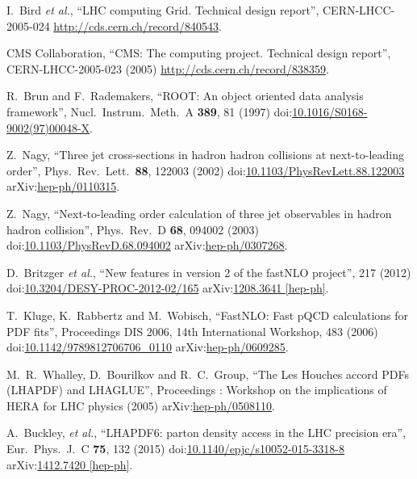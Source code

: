 \begin{thebibliography}{99}
I.~Bird {\it et al.}, ``LHC computing Grid. Technical design report'', CERN-LHCC-2005-024 \url{http://cds.cern.ch/record/840543}.

CMS Collaboration, ``CMS: The computing project. Technical design report'', CERN-LHCC-2005-023 (2005) \url{http://cds.cern.ch/record/838359}.

R.~Brun and F.~Rademakers, ``ROOT: An object oriented data analysis framework'', Nucl.\ Instrum.\ Meth.\ A {\bf 389}, 81 (1997) doi:\href{http://dx.doi.org/10.1016/S0168-9002(97)00048-X}{10.1016/S0168-9002(97)00048-X}.

Z.~Nagy, ``Three jet cross-sections in hadron hadron collisions at next-to-leading order'', Phys.\ Rev.\ Lett.\ {\bf 88}, 122003 (2002) doi:\href{http://dx.doi.org/10.1103/PhysRevLett.88.122003}{10.1103/PhysRevLett.88.122003} arXiv:\href{https://arxiv.org/abs/hep-ph/0110315}{hep-ph/0110315}.

Z.~Nagy, ``Next-to-leading order calculation of three jet observables in hadron hadron collision'', Phys.\ Rev.\ D {\bf 68}, 094002 (2003) doi:\href{http://dx.doi.org/10.1103/PhysRevD.68.094002}{10.1103/PhysRevD.68.094002} arXiv:\href{https://arxiv.org/abs/hep-ph/0307268}{hep-ph/0307268}.

D.~Britzger {\it et al.}, ``New features in version 2 of the fastNLO project'', 217 (2012) doi:\href{http://dx.doi.org/10.3204/DESY-PROC-2012-02/165}{10.3204/DESY-PROC-2012-02/165} arXiv:\href{https://arxiv.org/abs/1208.3641}{1208.3641 [hep-ph]}.

T.~Kluge, K.~Rabbertz and M.~Wobisch, ``FastNLO: Fast pQCD calculations for PDF fits'', Proceedings DIS 2006, 14th International Workshop, 483 (2006) doi:\href{http://dx.doi.org/10.1142/9789812706706\_0110}{10.1142/9789812706706\_0110} arXiv:\href{https://arxiv.org/abs/hep-ph/0609285}{hep-ph/0609285}.

M.~R.~Whalley, D.~Bourilkov and R.~C.~Group, ``The Les Houches accord PDFs (LHAPDF) and LHAGLUE'', Proceedings : Workshop on the implications of HERA for LHC physics (2005) arXiv:\href{https://arxiv.org/abs/hep-ph/0508110}{hep-ph/0508110}.

A.~Buckley, {\it et al.}, ``LHAPDF6: parton density access in the LHC precision era'', Eur.\ Phys.\ J.\ C {\bf 75}, 132 (2015) doi:\href{http://dx.doi.org/10.1140/epjc/s10052-015-3318-8}{10.1140/epjc/s10052-015-3318-8} arXiv:\href{https://arxiv.org/abs/1412.7420}{1412.7420 [hep-ph]}.



\end{thebibliography}
